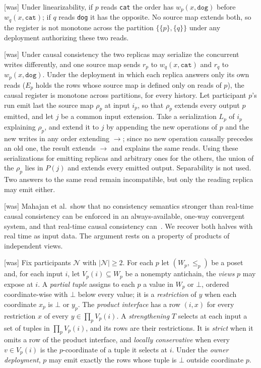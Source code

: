 \documentclass[sigconf]{cidr-2027}
\theoremstyle{remark}
\newcommand{\indesc}{input extension\xspace} %
\newcommand{\outrel}{extends\xspace}          %
\newcommand{\fiber}[1]{P(#1)}
\newcommand{\dog}{\texttt{dog}}
\newcommand{\catv}{\texttt{cat}}
\begin{document}
{\footnotesize\color{black!50}\noindent\textsf{[was]} Under linearizability, if $p$ reads \catv{} the order has
$w_p(x,\dog)$ before $w_q(x,\catv)$; if $q$ reads \dog{} it has the opposite.
No source map \outrel both, so the register is not monotone across the
partition $\{\{p\},\{q\}\}$ under any deployment authorizing these two reads.\par}



{\footnotesize\color{black!50}\noindent\textsf{[was]} Under causal consistency the two replicas may serialize the concurrent writes
differently, and one source map sends $r_p$ to $w_q(x,\catv)$ and $r_q$ to
$w_p(x,\dog)$.  Under the deployment in which each replica answers only its own
reads ($E_p$ holds the rows whose source map is defined only on reads of $p$),
the causal register is monotone across partitions, for every history.  Let
participant $p$'s run emit last the source map $\rho_p$ at input $i_p$, so that
$\rho_p$ \outrel every output $p$ emitted, and let $j$ be a common \indesc.
Take a serialization $L_p$ of $i_p$ explaining $\rho_p$, and extend it to $j$
by appending the new operations of $p$ and the new writes in any order
extending $\to$; since no new operation causally precedes an old one, the
result extends $\to$ and explains the same reads.  Using these serializations
for emitting replicas and arbitrary ones for the others, the union of the
$\rho_p$ lies in $\fiber{j}$ and \outrel every emitted output.  Separability is
not used.  Two answers to the same read remain incompatible, but only the
reading replica may emit either.\par}



{\footnotesize\color{black!50}\noindent\textsf{[was]} Mahajan et al.\ show that no consistency semantics stronger than real-time
causal consistency can be enforced in an always-available, one-way convergent
system, and that real-time causal consistency can~\cite{mahajan2011consistency}.
We recover both halves with real time as input data.  The argument rests on a
property of products of independent views.\par}



{\footnotesize\color{black!50}\noindent\textsf{[was]} Fix participants $\mathcal N$ with $|\mathcal N|\ge2$.  For each $p$ let $(W_p,\le_p)$ be a
poset and, for each input $i$, let $V_p(i)\subseteq W_p$ be a nonempty
antichain, the \emph{views} $p$ may expose at $i$.  A \emph{partial tuple}
assigns to each $p$ a value in $W_p$ or $\bot$, ordered coordinate-wise with
$\bot$ below every value; it is a \emph{restriction} of $y$ when each
coordinate $x_p$ is $\bot$ or $y_p$.  The \emph{product interface} has a row
$(i,x)$ for every restriction $x$ of every $y\in\prod_pV_p(i)$.  A
\emph{strengthening} $T$ selects at each input a set of tuples in
$\prod_pV_p(i)$, and its rows are their restrictions.  It is \emph{strict} when
it omits a row of the product interface, and \emph{locally conservative} when
every $v\in V_p(i)$ is the $p$-coordinate of a tuple it selects at $i$.  Under
the \emph{owner deployment}, $p$ may emit exactly the rows whose tuple is
$\bot$ outside coordinate $p$.\par}
\end{document}
